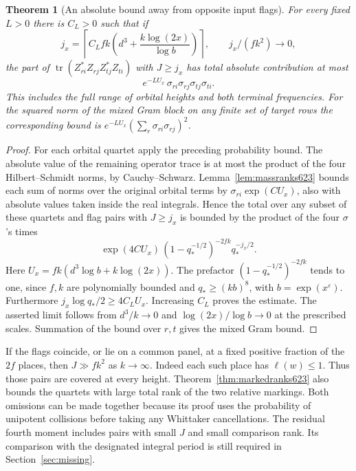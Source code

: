 \documentclass[a4paper,11pt]{article}
\newtheorem{theorem}[proposition]{Theorem}
\theoremstyle{definition}
\theoremstyle{remark}
\numberwithin{equation}{section}
\begin{document}
\begin{theorem}[An absolute bound away from opposite input flags]
\leavevmode\label{thm:flagfourth658}
For every fixed \(L>0\) there is \(C_L>0\) such that if
\[
   j_x=\left\lceil C_L f k
             \left(d^3+\frac{k\log(2x)}{\log b}\right)\right\rceil ,
                         \qquad j_x/(fk^2)\longrightarrow0 ,
\]
the part of \(\operatorname{tr}(Z_{ri}^*Z_{rj}Z_{tj}^*Z_{ti})\)
with \(J\ge j_x\) has total absolute contribution at most
\[
              e^{-L U_x}\,\sigma_{ri}\sigma_{rj}\sigma_{tj}\sigma_{ti}.
\]
This includes the full range of orbital heights and both terminal
frequencies. For the squared norm of the mixed Gram block on
any finite set of target rows the corresponding bound is
\(e^{-L U_x}(\sum_r\sigma_{ri}\sigma_{rj})^2\).
\end{theorem}
\begin{proof}
For each orbital quartet apply the preceding probability bound.
The absolute value of the remaining operator trace is at most
the product of the four Hilbert--Schmidt norms, by
Cauchy--Schwarz. Lemma~\ref{lem:massranks623} bounds each
sum of norms over the original orbital terms by
\(\sigma_{ri}\exp(CU_x)\), also with absolute values taken
inside the real integrals. Hence the total over any subset
of these quartets and flag pairs with \(J\ge j_x\) is bounded by
the product of the four \(\sigma\)'s times
\[
    \exp(4CU_x)\,(1-q_*^{-1/2})^{-2fk}q_*^{-j_x/2}.
\]
Here \(U_x=fk(d^3\log b+k\log(2x))\).
The prefactor \((1-q_*^{-1/2})^{-2fk}\) tends to one, since
\(f,k\) are polynomially bounded and \(q_*\ge(kb)^8\),
with \(b=\exp(x^\varepsilon)\). Furthermore
\(j_x\log q_*/2\ge4C_L U_x\). Increasing \(C_L\) proves
the estimate. The asserted limit follows from \(d^3/k\to0\)
and \(\log(2x)/\log b\to0\) at the prescribed scales.
Summation of the bound over \(r,t\) gives the mixed Gram bound.
\end{proof}

If the flags coincide, or lie on a common panel, at a fixed
positive fraction of the \(2f\) places, then \(J\gg fk^2\)
as \(k\to\infty\). Indeed each such place has \(\ell(w)\le1\).
Thus those pairs are covered at every height. Theorem~\ref{thm:markedranks623}
also bounds the quartets with large total rank of the two
relative markings. Both omissions can be made together because
its proof uses the probability of unipotent collisions before
taking any Whittaker cancellations. The residual fourth moment
includes pairs with small \(J\) and small comparison rank.
Its comparison with the designated integral period is still
required in Section~\ref{sec:missing}.
\end{document}

